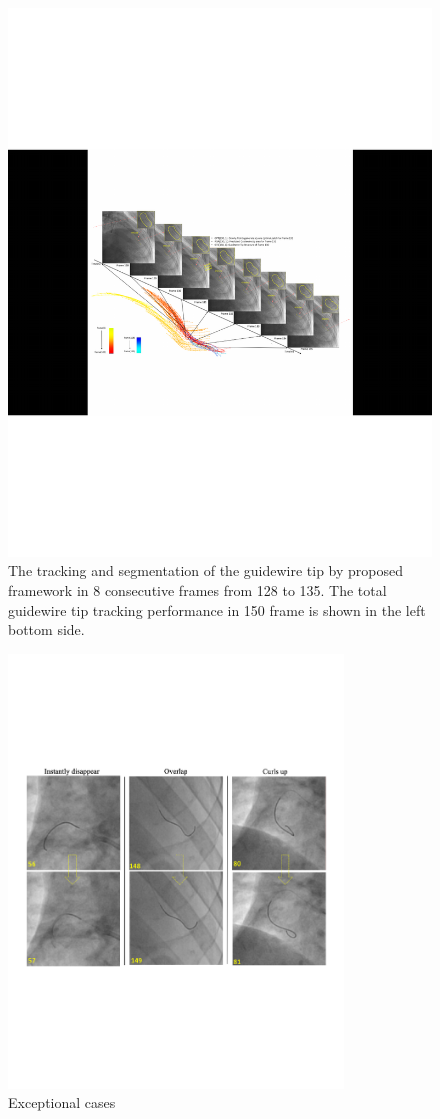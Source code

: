 \documentclass[letterpaper, 10 pt, conference]{ieeeconf}  %
\begin{document}
\begin{figure}[thpb]
	\centering  
	\includegraphics[scale=1.0]{figures/figure7}
		\caption{The tracking and segmentation of the guidewire tip by proposed framework in 8 consecutive frames from 128 to 135. The total guidewire tip tracking  performance in 150 frame is shown in the left bottom side.}  
	\label{fig.mcmthesis-logo} 
\end{figure}

\begin{figure}[thpb]
	\centering  
	\includegraphics[width=3.5in]{figures/figure9}
		\caption{Exceptional cases} 
	\label{fig.mcmthesis-logo} 
\end{figure}
\end{document}
